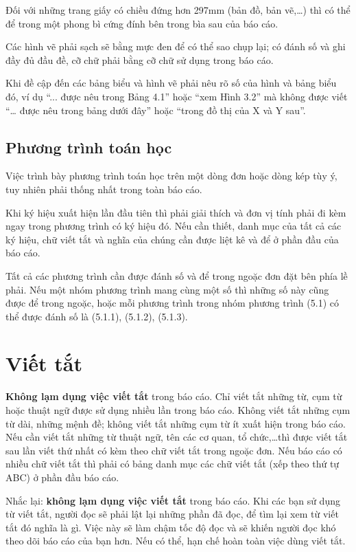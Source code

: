 Đối với những trang giấy có chiều đứng hơn 297mm (bản đồ, bản vẽ,\ldots) thì có thể để trong một phong bì cứng đính bên trong bìa sau của báo cáo.

Các hình vẽ phải sạch sẽ bằng mực đen để có thể sao chụp lại; có đánh số và ghi đầy đủ đầu đề, cỡ chữ phải bằng cỡ chữ sử dụng trong báo cáo.

Khi đề cập đến các bảng biểu và hình vẽ phải nêu rõ số của hình và bảng biểu đó, ví dụ ``... được nêu trong Bảng 4.1'' hoặc ``xem Hình 3.2'' mà không được viết ``… được nêu trong bảng dưới đây'' hoặc ``trong đồ thị của X và Y sau''.

\subsection{Phương trình toán học}

Việc trình bày phương trình toán học trên một dòng đơn hoặc dòng kép tùy ý, tuy nhiên phải thống nhất trong toàn báo cáo.

Khi ký hiệu xuất hiện lần đầu tiên thì phải giải thích và đơn vị tính phải đi kèm ngay trong phương trình có ký hiệu đó.
Nếu cần thiết, danh mục của tất cả các ký hiệu, chữ viết tắt và nghĩa của chúng cần được liệt kê và để ở phần đầu của báo cáo.

Tất cả các phương trình cần được đánh số và để trong ngoặc đơn đặt bên phía lề phải.
Nếu một nhóm phương trình mang cùng một số thì những số này cũng được để trong ngoặc, hoặc mỗi phương trình trong nhóm phương trình (5.1) có thể được đánh số là (5.1.1), (5.1.2), (5.1.3).

\section{Viết tắt}

\textbf{Không lạm dụng việc viết tắt} trong báo cáo.
Chỉ viết tắt những từ, cụm từ hoặc thuật ngữ được sử dụng nhiều lần trong báo cáo.
Không viết tắt những cụm từ  dài, những mệnh đề; không viết tắt những cụm từ ít xuất hiện trong báo cáo.
Nếu cần viết tắt những từ thuật ngữ, tên các cơ quan, tổ chức,\ldots thì được viết tắt sau lần viết thứ nhất có kèm theo chữ viết tắt trong ngoặc đơn.
Nếu báo cáo có nhiều chữ viết tắt thì phải có bảng danh mục các chữ viết tắt (xếp theo thứ tự ABC) ở phần đầu báo cáo.

Nhắc lại: \textbf{không lạm dụng việc viết tắt} trong báo cáo.
Khi các bạn sử dụng từ viết tắt, người đọc sẽ phải lật lại những phần đã đọc, để tìm lại xem từ viết tắt đó nghĩa là gì.
Việc này sẽ làm chậm tốc độ đọc và sẽ khiến người đọc khó theo dõi báo cáo của bạn hơn.
Nếu có thể, hạn chế hoàn toàn việc dùng viết tắt.

